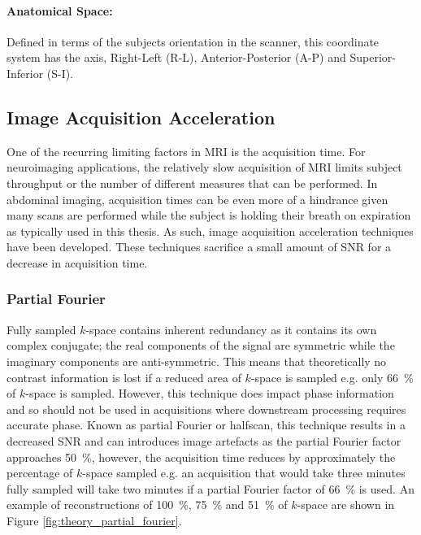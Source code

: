 \paragraph{Anatomical Space:}
Defined in terms of the subjects orientation in the scanner, this coordinate system has the axis, Right-Left (R-L), Anterior-Posterior (A-P) and Superior-Inferior (S-I).

\subsection{Image Acquisition Acceleration}
One of the recurring limiting factors in \ac{MRI} is the acquisition time. For neuroimaging applications, the relatively slow acquisition of \ac{MRI} limits subject throughput or the number of different measures that can be performed. In abdominal imaging, acquisition times can be even more of a hindrance given many scans are performed while the subject is holding their breath on expiration as typically used in this thesis. As such, image acquisition acceleration techniques have been developed. These techniques sacrifice a small amount of \ac{SNR} for a decrease in acquisition time.

\subsubsection{Partial Fourier}
\label{subsec:theory_partial_fourier}
Fully sampled $k$-space contains inherent redundancy as it contains its own complex conjugate; the real components of the signal are symmetric while the imaginary components are anti-symmetric. This means that theoretically no contrast information is lost if a reduced area of $k$-space is sampled e.g. only 66~\% of $k$-space is sampled. However, this technique does impact phase information and so should not be used in acquisitions where downstream processing requires accurate phase. Known as partial Fourier or halfscan, this technique results in a decreased \ac{SNR} and can introduces image artefacts as the partial Fourier factor approaches 50~\%, however, the acquisition time reduces by approximately the percentage of $k$-space sampled e.g. an acquisition that would take three minutes fully sampled will take two minutes if a partial Fourier factor of 66~\% is used. An example of reconstructions of 100~\%, 75~\% and 51~\% of $k$-space are shown in Figure \ref{fig:theory_partial_fourier}.

